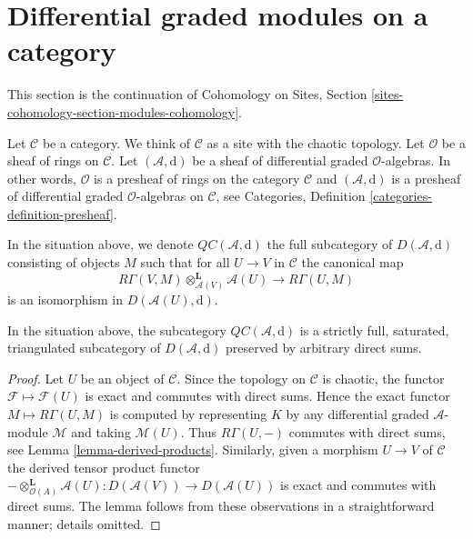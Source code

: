 \section{Differential graded modules on a category}
\label{section-modules-cohomology}

\noindent
This section is the continuation of
Cohomology on Sites, Section \ref{sites-cohomology-section-modules-cohomology}.

\medskip\noindent
Let $\mathcal{C}$ be a category. We think of $\mathcal{C}$ as a site with
the chaotic topology. Let $\mathcal{O}$ be a sheaf of rings on $\mathcal{C}$.
Let $(\mathcal{A}, \text{d})$ be a sheaf of differential graded
$\mathcal{O}$-algebras. In other words, $\mathcal{O}$ is
a presheaf of rings on the category $\mathcal{C}$ and
$(\mathcal{A}, \text{d})$ is a presheaf of differential graded
$\mathcal{O}$-algebras on $\mathcal{C}$, see
Categories, Definition \ref{categories-definition-presheaf}.

\begin{definition}
\label{definition-cartesian}
In the situation above, we denote
{\it $\mathit{QC}(\mathcal{A}, \text{d})$}
the full subcategory of $D(\mathcal{A}, \text{d})$
consisting of objects $M$ such that
for all $U \to V$ in $\mathcal{C}$ the canonical map
$$
R\Gamma(V, M) \otimes_{\mathcal{A}(V)}^\mathbf{L} \mathcal{A}(U)
\longrightarrow
R\Gamma(U, M)
$$
is an isomorphism in $D(\mathcal{A}(U), \text{d})$.
\end{definition}

\begin{lemma}
\label{lemma-cartesian-good-sub}
In the situation above, the subcategory $\mathit{QC}(\mathcal{A}, \text{d})$
is a strictly full, saturated, triangulated subcategory of
$D(\mathcal{A}, \text{d})$ preserved by arbitrary direct sums.
\end{lemma}

\begin{proof}
Let $U$ be an object of $\mathcal{C}$. Since the topology
on $\mathcal{C}$ is chaotic, the functor $\mathcal{F} \mapsto \mathcal{F}(U)$
is exact and commutes with direct sums. Hence the exact functor
$M \mapsto R\Gamma(U, M)$ is computed by representing $K$ by any
differential graded $\mathcal{A}$-module
$\mathcal{M}$ and taking $\mathcal{M}(U)$.
Thus $R\Gamma(U, -)$ commutes with direct sums, see
Lemma \ref{lemma-derived-products}.
Similarly, given a morphism $U \to V$ of $\mathcal{C}$
the derived tensor product functor
$- \otimes_{\mathcal{O}(A)}^\mathbf{L} \mathcal{A}(U) :
D(\mathcal{A}(V)) \to D(\mathcal{A}(U))$
is exact and commutes with direct sums. The lemma follows
from these observations in a straightforward manner; details omitted.
\end{proof}

